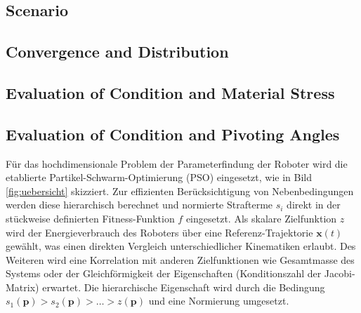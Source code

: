 \documentclass[fleqn,a4paper,10pt]{article}
\newcommand{\bm}[1]{\mathbf{#1}}
\begin{document}
\begin{multicols}{2}
\subsection{Scenario}

\subsection{Convergence and Distribution}

\subsection{Evaluation of Condition and Material Stress}

\subsection{Evaluation of Condition and Pivoting Angles}

Für das hochdimensionale Problem der Parameterfindung der Roboter wird die etablierte Partikel-Schwarm-Optimierung (PSO) eingesetzt, wie in Bild\,\ref{fig:uebersicht} skizziert.
Zur effizienten Berücksichtigung von Nebenbedingungen werden diese hierarchisch berechnet und normierte Strafterme $s_i$ direkt in der stückweise definierten Fitness-Funktion $f$ eingesetzt.
Als skalare Zielfunktion $z$ wird der Energieverbrauch des Roboters über eine Referenz-Trajektorie $\bm{x}(t)$ gewählt, was einen direkten Vergleich unterschiedlicher Kinematiken erlaubt.
Des Weiteren wird eine Korrelation mit anderen Zielfunktionen wie Gesamtmasse des Systems oder der Gleichförmigkeit der Eigenschaften (Konditionszahl der Jacobi-Matrix) erwartet.
Die hierarchische Eigenschaft wird durch die Bedingung $s_1(\bm{p})>s_2(\bm{p})>\dots>z(\bm{p})$ und eine Normierung umgesetzt.


\end{multicols}
\end{document}
